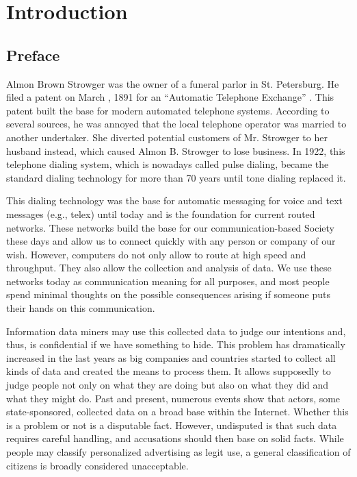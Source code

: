 


\part{Introduction}
\chapter{Preface}
Almon Brown Strowger was the owner of a funeral parlor in St. Petersburg. He filed a patent on March , 1891 for an ``Automatic Telephone Exchange'' \cite{pulseDialingPatent}. This patent built the base for modern automated telephone systems. According to several sources, he was annoyed that the local telephone operator was married to another undertaker. She diverted potential customers of Mr. Strowger to her husband instead, which caused Almon B. Strowger to lose business. In 1922, this telephone dialing system, which is nowadays called pulse dialing, became the standard dialing technology for more than 70 years until tone dialing replaced it.

This dialing technology was the base for automatic messaging for voice and text messages (e.g., telex) until today and is the foundation for current routed networks. These networks build the base for our communication-based Society these days and allow us to connect quickly with any person or company of our wish. However, computers do not only allow to route at high speed and throughput. They also allow the collection and analysis of data. We use these networks today as communication meaning for all purposes, and most people spend minimal thoughts on the possible consequences arising if someone puts their hands on this communication. 

Information data miners may use this collected data to judge our intentions and, thus, is confidential if we have something to hide. This problem has dramatically increased in the last years as big companies and countries started to collect all kinds of data and created the means to process them. It allows supposedly to judge people not only on what they are doing but also on what they did and what they might do. Past and present, numerous events show that actors, some state-sponsored, collected data on a broad base within the Internet. Whether this is a problem or not is a disputable fact. However, undisputed is that such data requires careful handling, and accusations should then base on solid facts. While people may classify personalized advertising as legit use, a general classification of citizens is broadly considered unacceptable\cite{NCR2013,XKeyscore,Ball2013,Greenberg2013,Leuenberger1989}.

